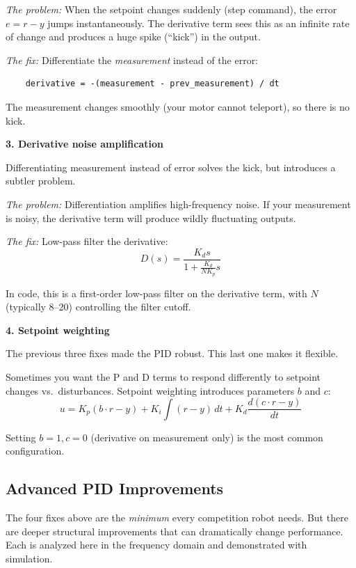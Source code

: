 \textit{The problem:} When the setpoint changes suddenly (step command), the error $e = r - y$ jumps instantaneously. The derivative term sees this as an infinite rate of change and produces a huge spike (``kick'') in the output.

\textit{The fix:} Differentiate the \textit{measurement} instead of the error:
\begin{verbatim}
    derivative = -(measurement - prev_measurement) / dt
\end{verbatim}

The measurement changes smoothly (your motor cannot teleport), so there is no kick.

\textbf{3. Derivative noise amplification}

Differentiating measurement instead of error solves the kick, but introduces a subtler problem.

\textit{The problem:} Differentiation amplifies high-frequency noise. If your measurement is noisy, the derivative term will produce wildly fluctuating outputs.

\textit{The fix:} Low-pass filter the derivative:
\begin{equation}
D(s) = \frac{K_d s}{1 + \frac{K_d}{N K_p} s}
\end{equation}

In code, this is a first-order low-pass filter on the derivative term, with $N$ (typically 8--20) controlling the filter cutoff.

\textbf{4. Setpoint weighting}

The previous three fixes made the PID robust. This last one makes it flexible.

Sometimes you want the P and D terms to respond differently to setpoint changes vs.\ disturbances. Setpoint weighting introduces parameters $b$ and $c$:
\begin{equation}
u = K_p(b \cdot r - y) + K_i \int (r - y) \, dt + K_d \frac{d(c \cdot r - y)}{dt}
\end{equation}

Setting $b = 1, c = 0$ (derivative on measurement only) is the most common configuration.

\subsection{Advanced PID Improvements}

The four fixes above are the \textit{minimum} every competition robot needs. But there are deeper structural improvements that can dramatically change performance. Each is analyzed here in the frequency domain and demonstrated with simulation.

